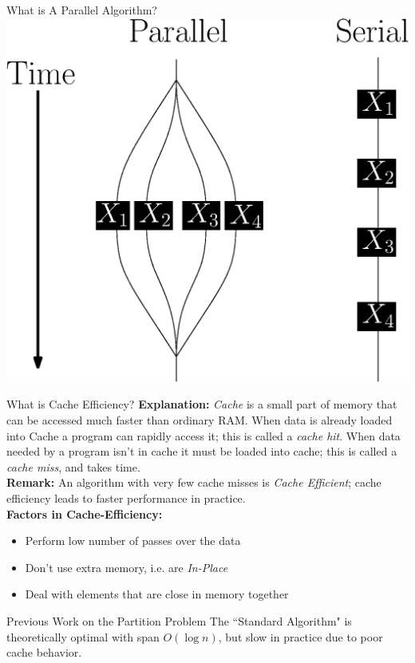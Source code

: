 \documentclass[table,serif,mathserif,final]{beamer}
\theoremstyle{remark}
\begin{document}
\begin{frame}{}
\begin{columns}[t]
\begin{column}{0.5\linewidth}
\begin{block}{\Huge What is A Parallel Algorithm?}
  \centering
  \includegraphics[width=0.8\linewidth]{imgs/parallelForLoop/serialParallelComparison.eps}
\end{block}
\begin{block}{\Huge What is Cache Efficiency?}
  \justifying
  \Huge
  \textbf{Explanation:} \emph{Cache} is a small part of memory that can be accessed much faster than ordinary RAM. When data is already loaded into Cache a program can rapidly access it; this is called a \emph{cache hit}. When data needed by a program isn't in cache it must be loaded into cache; this is called a \emph{cache miss}, and takes time. \\
  \textbf{Remark:} An algorithm with very few cache misses is \emph{Cache Efficient}; cache efficiency leads to faster performance in practice.\\
  \textbf{Factors in Cache-Efficiency:}
  \begin{itemize}
    \item Perform low number of passes over the data
    \item Don't use extra memory, i.e. are \emph{In-Place}
    \item Deal with elements that are close in memory together
  \end{itemize}
\end{block}

\begin{block}{\Huge Previous Work on the Partition Problem}
  \justifying
  \Huge
  The ``Standard Algorithm" is {\color{darkgreen} theoretically optimal with span $O(\log n)$,} {\color{red} but slow in practice due to poor cache behavior.}


\end{block}
\end{column}
\end{columns}
\end{frame}
\end{document}

